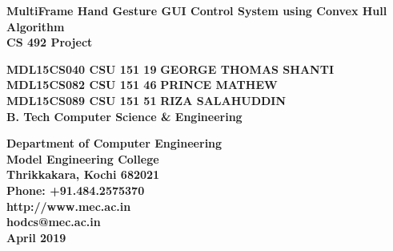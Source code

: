 \documentclass[11pt]{report}
\begin{document}
\renewcommand\bibname{References}
\pagestyle{fancy}
\fancyhead{}
\fancyfoot{}
\fancyfoot[c]{\thepage}
\renewcommand{\chaptermark}[1]{
\markboth{\thechapter.\ #1}{}} 
\renewcommand{\headrulewidth}{0.1pt}
\fancyhead[r]{\slshape \leftmark}
\addtolength{\headheight}{\baselineskip}
\addtolength{\headsep}{.1in}
\lhead{\nouppercase{\rightmark}}
\rhead{\nouppercase{\leftmark}}

\begin{titlepage}
\begin{center}

\Huge{\textbf{MultiFrame Hand Gesture GUI Control System using Convex Hull Algorithm}}\\
\vspace{0.05in}
\large{\textbf{CS 492 Project\\}}
\vspace{1.2in}

\Large{\textbf{MDL15CS040 CSU 151 19}}	\hspace{.1in}	\Large{\textbf{GEORGE THOMAS SHANTI}}\\ 
\Large{\textbf{MDL15CS082 CSU 151 46}}	\hspace{.1in}	\Large{\textbf{PRINCE MATHEW}}\\ 
\Large{\textbf{MDL15CS089 CSU 151 51}}	\hspace{.1in}	\Large{\textbf{RIZA SALAHUDDIN}}\\ 
\Large{\textbf{B. Tech Computer Science \& Engineering}}


\vspace{1in}
\begin{figure}[h]
\begin{center}
\end{center}
\end{figure}
\textbf{
Department of Computer Engineering\\
Model Engineering College\\
Thrikkakara, Kochi 682021\\
Phone: +91.484.2575370\\
http://www.mec.ac.in \\
hodcs@mec.ac.in\\
\vspace{0.2in}
{\upshape April 2019}
}
\end{center}
\end{titlepage}
\end{document}
